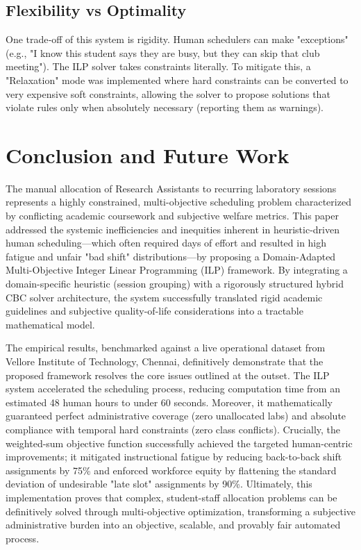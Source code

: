 \documentclass[journal,onecolumn]{IEEEtran}
\begin{document}
\subsection{Flexibility vs Optimality}
One trade‑off of this system is rigidity. Human schedulers can make "exceptions" (e.g., "I know this student says they are busy, but they can skip that club meeting"). The ILP solver takes constraints literally. To mitigate this, a "Relaxation" mode was implemented where hard constraints can be converted to very expensive soft constraints, allowing the solver to propose solutions that violate rules only when absolutely necessary (reporting them as warnings).

\section{Conclusion and Future Work}

The manual allocation of Research Assistants to recurring laboratory sessions represents a highly constrained, multi-objective scheduling problem characterized by conflicting academic coursework and subjective welfare metrics. This paper addressed the systemic inefficiencies and inequities inherent in heuristic-driven human scheduling—which often required days of effort and resulted in high fatigue and unfair "bad shift" distributions—by proposing a Domain-Adapted Multi-Objective Integer Linear Programming (ILP) framework. By integrating a domain-specific heuristic (session grouping) with a rigorously structured hybrid CBC solver architecture, the system successfully translated rigid academic guidelines and subjective quality-of-life considerations into a tractable mathematical model.

The empirical results, benchmarked against a live operational dataset from Vellore Institute of Technology, Chennai, definitively demonstrate that the proposed framework resolves the core issues outlined at the outset. The ILP system accelerated the scheduling process, reducing computation time from an estimated 48 human hours to under 60 seconds. Moreover, it mathematically guaranteed perfect administrative coverage (zero unallocated labs) and absolute compliance with temporal hard constraints (zero class conflicts). Crucially, the weighted-sum objective function successfully achieved the targeted human-centric improvements; it mitigated instructional fatigue by reducing back-to-back shift assignments by 75\% and enforced workforce equity by flattening the standard deviation of undesirable "late slot" assignments by 90\%. Ultimately, this implementation proves that complex, student-staff allocation problems can be definitively solved through multi-objective optimization, transforming a subjective administrative burden into an objective, scalable, and provably fair automated process.
\end{document}
